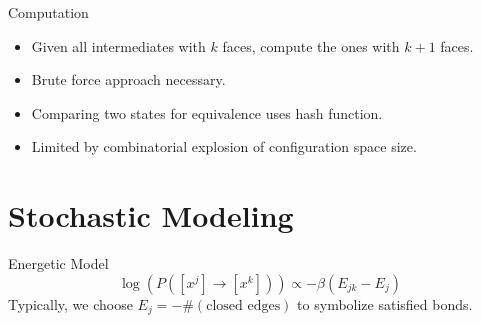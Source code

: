 \documentclass{beamer}
\begin{document}
\begin{frame}{Computation}
\begin{itemize}
\item Given all intermediates with $k$ faces, compute the ones with $k+1$ faces.
\item Brute force approach necessary.  
\item Comparing two states for equivalence uses hash function. 
\item Limited by combinatorial explosion of configuration space size.
\end{itemize}
\end{frame}

\section{Stochastic Modeling}
\begin{frame}{Energetic Model}
  \centering
$$\log\left(P([x^j] \to [x^k]) \right) \propto -\beta(E_{jk} - E_j)$$
Typically, we choose $E_j = -\#\left(\text{closed edges}\right)$ to symbolize satisfied bonds. 
\end{frame}
\end{document}
